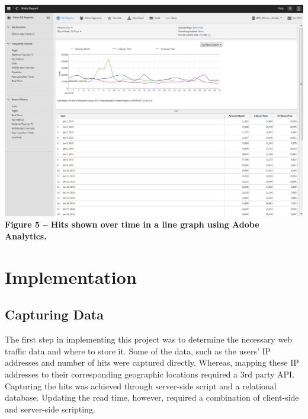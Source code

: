 \documentclass[12pt]{article}
\begin{document}
\noindent\includegraphics[scale=0.4]{img/adobe} \\
\noindent\textbf{Figure 5 -- Hits shown over time in a line graph using Adobe Analytics.} \\

\vfill


\section{Implementation}
\subsection{Capturing Data}
The first step in implementing this project was to determine the necessary web traffic data and where to store it. Some of the data, such as the users' IP addresses and number of hits were captured directly. Whereas, mapping these IP addresses to their corresponding geographic locations required a 3rd party API. Capturing the hits was achieved through server-side script and a relational database. Updating the read time, however, required a combination of client-side and server-side scripting.   
\end{document}
